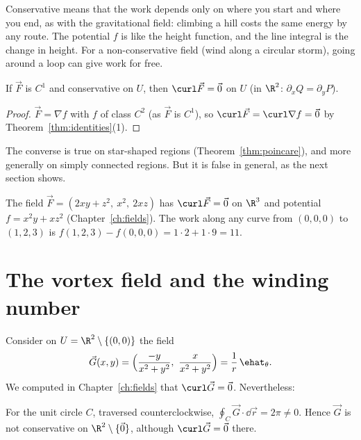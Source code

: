 \begin{intuition}
Conservative means that the work depends only on where you start and where you end, as with the gravitational field: climbing a hill costs the same energy by any route. The potential $f$ is like the height function, and the line integral is the change in height. For a non-conservative field (wind along a circular storm), going around a loop can give work for free.
\end{intuition}

\begin{theorem}\label{thm:necessary}
If $\vec F$ is $C^1$ and conservative on $U$, then $\curl\vec F=\vec 0$ on $U$ (in $\R^2$: $\partial_xQ=\partial_yP$).
\end{theorem}

\begin{proof}
$\vec F=\nabla f$ with $f$ of class $C^2$ (as $\vec F$ is $C^1$), so $\curl\vec F=\curl\nabla f=\vec 0$ by Theorem~\ref{thm:identities}(1).
\end{proof}

The converse is true on star-shaped regions (Theorem~\ref{thm:poincare}), and more generally on simply connected regions. But it is false in general, as the next section shows.

\begin{example}
The field $\vec F=(2xy+z^2,\ x^2,\ 2xz)$ has $\curl\vec F=\vec 0$ on $\R^3$ and potential $f=x^2y+xz^2$ (Chapter~\ref{ch:fields}). The work along any curve from $(0,0,0)$ to $(1,2,3)$ is $f(1,2,3)-f(0,0,0)=1\cdot2+1\cdot9=11$.
\end{example}

\section{The vortex field and the winding number}

Consider on $U=\R^2\setminus\{(0,0)\}$ the field
\[
\vec G(x,y)=\Bigl(\frac{-y}{x^2+y^2},\ \frac{x}{x^2+y^2}\Bigr)=\frac1r\,\ehat_\theta .
\]
We computed in Chapter~\ref{ch:fields} that $\curl\vec G=\vec 0$. Nevertheless:

\begin{theorem}\label{thm:vortex}
For the unit circle $C$, traversed counterclockwise, $\oint_C\vec G\cdot\dd\vec r=2\pi\neq0$. Hence $\vec G$ is not conservative on $\R^2\setminus\{\vec 0\}$, although $\curl\vec G=\vec 0$ there.
\end{theorem}

